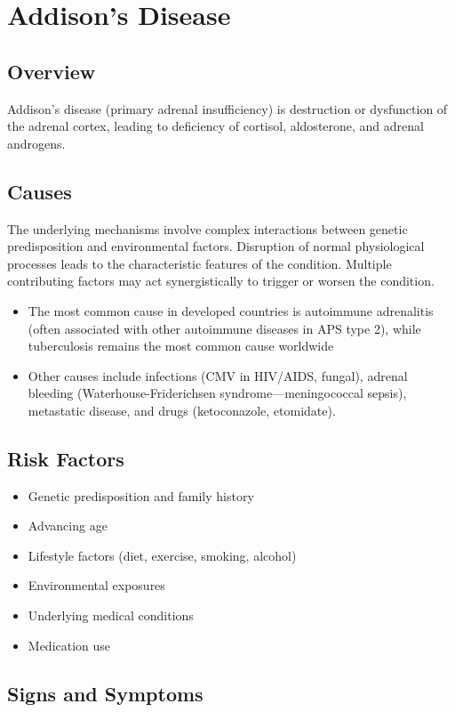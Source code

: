 \chapter{Addison's Disease}
\label{sec:Addison's Disease}

\section{Overview}
Addison's disease (primary adrenal insufficiency) is destruction or dysfunction of the adrenal cortex, leading to deficiency of cortisol, aldosterone, and adrenal androgens.
\section{Causes}
The underlying mechanisms involve complex interactions between genetic predisposition and environmental factors. Disruption of normal physiological processes leads to the characteristic features of the condition. Multiple contributing factors may act synergistically to trigger or worsen the condition.

\begin{itemize}[noitemsep]
  \item The most common cause in developed countries is autoimmune adrenalitis (often associated with other autoimmune diseases in APS type 2), while tuberculosis remains the most common cause worldwide
  \item Other causes include infections (CMV in HIV/AIDS, fungal), adrenal bleeding (Waterhouse-Friderichsen syndrome---meningococcal sepsis), metastatic disease, and drugs (ketoconazole, etomidate).
\end{itemize}
\section{Risk Factors}


\begin{itemize}[noitemsep]
  \item Genetic predisposition and family history
  \item Advancing age
  \item Lifestyle factors (diet, exercise, smoking, alcohol)
  \item Environmental exposures
  \item Underlying medical conditions
  \item Medication use
\end{itemize}
\section{Signs and Symptoms}


